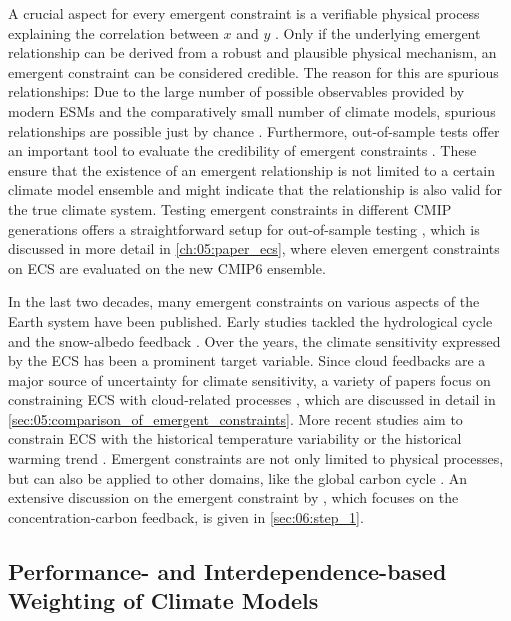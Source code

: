 A crucial aspect for every emergent constraint is a verifiable physical process
explaining the correlation between $x$ and $y$ \autocite{Hall2019}. Only if the
underlying emergent relationship can be derived from a robust and plausible
physical mechanism, an emergent constraint can be considered credible. The
reason for this are spurious relationships: Due to the large number of possible
observables provided by modern \acp{ESM} and the comparatively small number of
climate models, spurious relationships are possible just by chance
\autocite{Caldwell2014}. Furthermore, out-of-sample tests offer an important
tool to evaluate the credibility of emergent constraints \autocite{Hall2019}.
These ensure that the existence of an emergent relationship is not limited to a
certain climate model ensemble and might indicate that the relationship is also
valid for the true climate system. Testing emergent constraints in different
\ac{CMIP} generations offers a straightforward setup for out-of-sample testing
\autocite{Caldwell2018}, which is discussed in more detail in
\cref{ch:05:paper_ecs}, where eleven emergent constraints on \ac{ECS} are
evaluated on the new \acs{CMIP}6 ensemble.

In the last two decades, many emergent constraints on various aspects of the
Earth system have been published. Early studies tackled the hydrological cycle
\autocite{Allen2002} and the snow-albedo feedback \autocite{Hall2006}. Over the
years, the climate sensitivity expressed by the \ac{ECS} has been a prominent
target variable. Since cloud feedbacks are a major source of uncertainty for
climate sensitivity, a variety of papers focus on constraining \ac{ECS} with
cloud-related processes \autocite{Brient2015, Brient2016, Fasullo2012,
  Lipat2017, Sherwood2014, Su2014, Tian2015, Volodin2008, Qu2013, Zhai2015},
which are discussed in detail in
\cref{sec:05:comparison_of_emergent_constraints}. More recent studies aim to
constrain \ac{ECS} with the historical temperature variability
\autocite{Cox2018} or the historical warming trend
\autocite{JimenezdelaCuesta2019, Nijsse2020, Tokarska2020}. Emergent
constraints are not only limited to physical processes, but can also be applied
to other domains, like the global carbon cycle \autocite{Cox2013,
  Kwiatkowski2017, Wenzel2014, Wenzel2016, Winkler2019}. An extensive
discussion on the emergent constraint by \textcite{Wenzel2016}, which focuses
on the concentration-carbon feedback, is given in \cref{sec:06:step_1}.


\subsection{Performance- and Interdependence-based Weighting of Climate Models}
\label{subsec:02:model_weighting}

